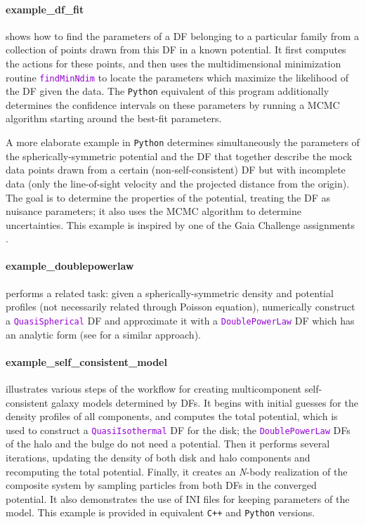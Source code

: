 \documentclass[12pt]{article}
\newcommand{\Nbody}{\textsl{N}-body\xspace}
\newcommand{\Cpp}  {\texttt{C++}\xspace}
\newcommand{\Python}{\texttt{Python}\xspace}
\newcommand{\ttt}[1]{\textcolor{darkviolet}{\texttt{#1}}}
\begin{document}
\paragraph{example_df_fit} shows how to find the parameters of a DF belonging to a particular family from a collection of points drawn from this DF in a known potential. It first computes the actions for these points, and then uses the multidimensional minimization routine \ttt{findMinNdim} to locate the parameters which maximize the likelihood of the DF given the data.
The \Python equivalent of this program additionally determines the confidence intervals on these parameters by running a MCMC algorithm starting around the best-fit parameters.

A more elaborate example in \Python determines simultaneously the parameters of the spherically-symmetric potential and the DF that together describe the mock data points drawn from a certain (non-self-consistent) DF but with incomplete data (only the line-of-sight velocity and the projected distance from the origin). The goal is to determine the properties of the potential, treating the DF as nuisance parameters; it also uses the MCMC algorithm to determine uncertainties. 
This example is inspired by one of the Gaia Challenge assignments \cite{Read2017}.

\paragraph{example_doublepowerlaw} performs a related task: given a spherically-symmetric density and potential profiles (not necessarily related through Poisson equation), numerically construct a \ttt{QuasiSpherical} DF and approximate it with a \ttt{DoublePowerLaw} DF which has an analytic form (see \cite{Jeffreson2017} for a similar approach).

\paragraph{example_self_consistent_model} illustrates various steps of the workflow for creating multicomponent self-consistent galaxy models determined by DFs. It begins with initial guesses for the density profiles of all components, and computes the total potential, which is used to construct a \ttt{QuasiIsothermal} DF for the disk; the \ttt{DoublePowerLaw} DFs of the halo and the bulge do not need a potential. Then it performs several iterations, updating the density of both disk and halo components and recomputing the total potential. Finally, it creates an \Nbody realization of the composite system by sampling particles from both DFs in the converged potential. It also demonstrates the use of INI files for keeping parameters of the model. This example is provided in equivalent \Cpp and \Python versions.
\end{document}
